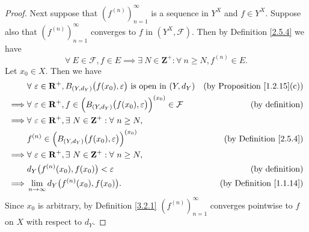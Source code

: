 \begin{proof}
    Next suppose that \((f^{(n)})_{n = 1}^\infty\) is a sequence in \(Y^X\) and \(f \in Y^X\).
    Suppose also that \((f^{(n)})_{n = 1}^\infty\) converges to \(f\) in \((Y^X, \mathcal{F})\).
    Then by Definition \ref{2.5.4} we have
    \[
        \forall\ E \in \mathcal{F}, f \in E \implies \exists\ N \in \mathbf{Z}^+ : \forall\ n \geq N, f^{(n)} \in E.
    \]
    Let \(x_0 \in X\).
    Then we have
    \begin{align*}
                 & \forall\ \varepsilon \in \mathbf{R}^+, B_{(Y, d_Y)}\big(f(x_0), \varepsilon\big) \text{ is open in } (Y, d_Y)            & \text{(by Proposition \ref{1.2.15}(c))} \\
        \implies & \forall\ \varepsilon \in \mathbf{R}^+, f \in \Big(B_{(Y, d_Y)}\big(f(x_0), \varepsilon\big)\Big)^{(x_0)} \in \mathcal{F} & \text{(by definition)}                  \\
        \implies & \forall\ \varepsilon \in \mathbf{R}^+, \exists\ N \in \mathbf{Z}^+ : \forall\ n \geq N,                                                                            \\
                 & f^{(n)} \in \Big(B_{(Y, d_Y)}\big(f(x_0), \varepsilon\big)\Big)^{(x_0)}                                                  & \text{(by Definition \ref{2.5.4})}      \\
        \implies & \forall\ \varepsilon \in \mathbf{R}^+, \exists\ N \in \mathbf{Z}^+ : \forall\ n \geq N,                                                                            \\
                 & d_Y\big(f^{(n)}(x_0), f(x_0)\big) < \varepsilon                                                                          & \text{(by definition)}                  \\
        \implies & \lim_{n \to \infty} d_Y\big(f^{(n)}(x_0), f(x_0)\big).                                                                   & \text{(by Definition \ref{1.1.14})}
    \end{align*}
    Since \(x_0\) is arbitrary, by Definition \ref{3.2.1} \((f^{(n)})_{n = 1}^\infty\) converges pointwise to \(f\) on \(X\) with respect to \(d_Y\).


\end{proof}

